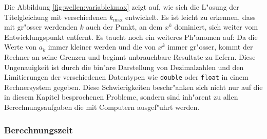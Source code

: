 Die Abbildung \ref{fig:wellen:variablekmax} zeigt auf, wie sich die L"osung 
der Titelgleichung mit verschiedenen $k_{\text{max}}$ entwickelt. Es ist leicht 
zu erkennen, dass mit gr"osser werdenden $k$ auch der Punkt, an dem $x^k$ 
dominiert, sich weiter vom Entwicklungspunkt entfernt. Es taucht noch ein 
weiteres Ph"anomen auf: Da die Werte von $a_k$ immer kleiner werden und die von 
$x^k$ immer gr"osser, kommt der Rechner an seine Grenzen und beginnt 
unbrauchbare Resultate zu liefern. Diese Ungenauigkeit ist durch die bin"are 
Darstellung von Dezimalzahlen und den Limitierungen der verschiedenen 
Datentypen wie \texttt{double} oder \texttt{float} in einem Rechnersystem 
gegeben. Diese Schwierigkeiten beschr"anken sich nicht nur auf die in diesem 
Kapitel besprochenen Probleme, sondern sind inh"arent zu allen 
Berechnungsaufgaben die mit Computern ausgef"uhrt werden.

\subsubsection{Berechnungszeit}



